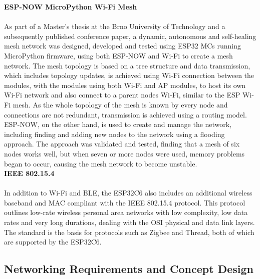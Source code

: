 
\textbf{ESP-NOW MicroPython Wi-Fi Mesh}\\\\
As part of a Master's thesis at the Brno University of Technology and a subsequently published conference paper, a dynamic, autonomous and self-healing mesh network was designed, developed and tested using ESP32 MCs running MicroPython firmware, using both ESP-NOW and Wi-Fi to create a mesh network. The mesh topology is based on a tree structure and data transmission, which includes topology updates, is achieved using Wi-Fi connection between the modules, with the modules using both Wi-Fi and AP modules, to host its own Wi-Fi network and also connect to a parent nodes Wi-Fi, similar to the ESP Wi-Fi mesh. As the whole topology of the mesh is known by every node and connections are not redundant, transmission is achieved using a routing model. ESP-NOW, on the other hand, is used to create and manage the network, including finding and adding new nodes to the network using a flooding approach. The approach was validated and tested, finding that a mesh of six nodes works well, but when seven or more nodes were used, memory problems began to occur, causing the mesh network to become unstable. 
\citep{sestak_dynamic_2022, sestak_dynamic_2022-1}
\\

\textbf{IEEE 802.15.4}\\\\
In addition to Wi-Fi and BLE, the ESP32C6 also includes an additional wireless baseband and MAC compliant with the IEEE 802.15.4 protocol. This protocol outlines low-rate wireless personal area networks with low complexity, low data rates and very long durations, dealing with the OSI physical and data link layers. The standard is the basis for protocols such as Zigbee and Thread, both of which are supported by the ESP32C6. \citep{noauthor_ieee_2024, noauthor_ieee_2009, espressif_systems_esp32-c6_2024, seeed_studio_seeed_2024-1, seeed_studio_seeed_2024}

\subsection{\label{sec:methods_net_des}Networking Requirements and Concept Design}

